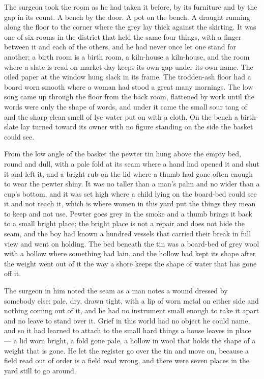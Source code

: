 The surgeon took the room as he had taken it before, by its furniture and by the gap in its count. A bench by the door. A pot on the bench. A draught running along the floor to the corner where the grey lay thick against the skirting. It was one of six rooms in the district that held the same four things, with a finger between it and each of the others, and he had never once let one stand for another; a birth room is a birth room, a kiln-house a kiln-house, and the room where a slate is read on market-day keeps its own gap under its own name. The oiled paper at the window hung slack in its frame. The trodden-ash floor had a board worn smooth where a woman had stood a great many mornings. The low song came up through the floor from the back room, flattened by work until the words were only the shape of words, and under it came the small sour tang of  and the sharp clean smell of lye water put on with a cloth. On the bench a birth-slate lay turned toward its owner with no figure standing on the side the basket could see.

From the low angle of the basket the pewter tin hung above the empty bed, round and dull, with a pale fold at its seam where a hand had opened it and shut it and left it, and a bright rub on the lid where a thumb had gone often enough to wear the pewter shiny. It was no taller than a man's palm and no wider than a cup's bottom, and it was set high where a child lying on the board-bed could see it and not reach it, which is where women in this yard put the things they mean to keep and not use. Pewter goes grey in the smoke and a thumb brings it back to a small bright place; the bright place is not a repair and does not hide the seam, and the boy had known a hundred vessels that carried their break in full view and went on holding. The bed beneath the tin was a board-bed of grey wool with a hollow where something had lain, and the hollow had kept its shape after the weight went out of it the way a shore keeps the shape of water that has gone off it.

The surgeon in him noted the seam as a man notes a wound dressed by somebody else: pale, dry, drawn tight, with a lip of worn metal on either side and nothing coming out of it, and he had no instrument small enough to take it apart and no leave to stand over it. Grief in this world had no object he could name, and so it had learned to attach to the small hard things a house leaves in place --- a lid worn bright, a fold gone pale, a hollow in wool that holds the shape of a weight that is gone. He let the register go over the tin and move on, because a field read out of order is a field read wrong, and there were seven places in the yard still to go around.

